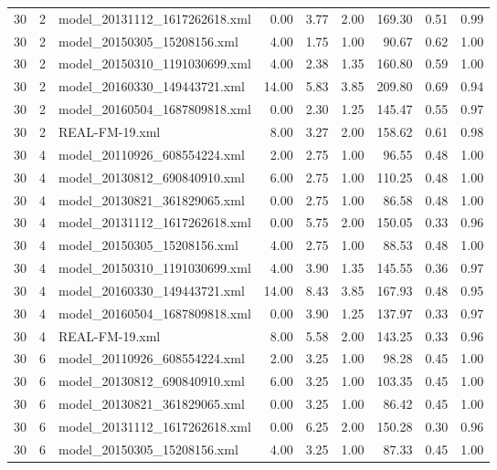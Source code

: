 \begin{table}[ht]
\begin{tabular}{rrlrrrrrr}
   30 &   2 & model\_20131112\_1617262618.xml & 0.00 & 3.77 & 2.00 & 169.30 & 0.51 & 0.99 \\ 
   30 &   2 & model\_20150305\_15208156.xml & 4.00 & 1.75 & 1.00 & 90.67 & 0.62 & 1.00 \\ 
   30 &   2 & model\_20150310\_1191030699.xml & 4.00 & 2.38 & 1.35 & 160.80 & 0.59 & 1.00 \\ 
   30 &   2 & model\_20160330\_149443721.xml & 14.00 & 5.83 & 3.85 & 209.80 & 0.69 & 0.94 \\ 
   30 &   2 & model\_20160504\_1687809818.xml & 0.00 & 2.30 & 1.25 & 145.47 & 0.55 & 0.97 \\ 
   30 &   2 & REAL-FM-19.xml & 8.00 & 3.27 & 2.00 & 158.62 & 0.61 & 0.98 \\ 
   30 &   4 & model\_20110926\_608554224.xml & 2.00 & 2.75 & 1.00 & 96.55 & 0.48 & 1.00 \\ 
   30 &   4 & model\_20130812\_690840910.xml & 6.00 & 2.75 & 1.00 & 110.25 & 0.48 & 1.00 \\ 
   30 &   4 & model\_20130821\_361829065.xml & 0.00 & 2.75 & 1.00 & 86.58 & 0.48 & 1.00 \\ 
   30 &   4 & model\_20131112\_1617262618.xml & 0.00 & 5.75 & 2.00 & 150.05 & 0.33 & 0.96 \\ 
   30 &   4 & model\_20150305\_15208156.xml & 4.00 & 2.75 & 1.00 & 88.53 & 0.48 & 1.00 \\ 
   30 &   4 & model\_20150310\_1191030699.xml & 4.00 & 3.90 & 1.35 & 145.55 & 0.36 & 0.97 \\ 
   30 &   4 & model\_20160330\_149443721.xml & 14.00 & 8.43 & 3.85 & 167.93 & 0.48 & 0.95 \\ 
   30 &   4 & model\_20160504\_1687809818.xml & 0.00 & 3.90 & 1.25 & 137.97 & 0.33 & 0.97 \\ 
   30 &   4 & REAL-FM-19.xml & 8.00 & 5.58 & 2.00 & 143.25 & 0.33 & 0.96 \\ 
   30 &   6 & model\_20110926\_608554224.xml & 2.00 & 3.25 & 1.00 & 98.28 & 0.45 & 1.00 \\ 
   30 &   6 & model\_20130812\_690840910.xml & 6.00 & 3.25 & 1.00 & 103.35 & 0.45 & 1.00 \\ 
   30 &   6 & model\_20130821\_361829065.xml & 0.00 & 3.25 & 1.00 & 86.42 & 0.45 & 1.00 \\ 
   30 &   6 & model\_20131112\_1617262618.xml & 0.00 & 6.25 & 2.00 & 150.28 & 0.30 & 0.96 \\ 
   30 &   6 & model\_20150305\_15208156.xml & 4.00 & 3.25 & 1.00 & 87.33 & 0.45 & 1.00 \\ 

\end{tabular}
\end{table}
